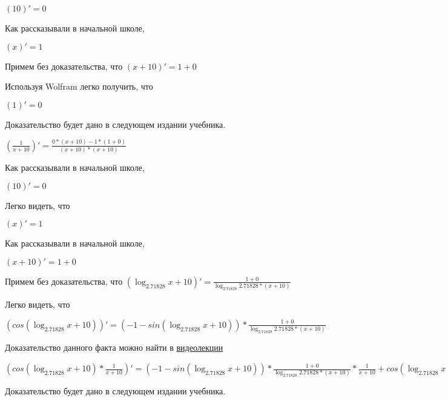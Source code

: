 \documentclass[12pt,a4paper,fleqn]{article}
\theoremstyle{definition}
\begin{document}
$( 10 )' =  0 $

Как рассказывали в начальной школе,

$( x )' =  1 $

Примем без доказательства, что
$( x  +  10 )' =  1  +  0 $

Используя Wolfram легко получить, что

$( 1 )' =  0 $

Доказательство будет дано в следующем издании учебника.

$(\frac{ 1 }{ x  +  10 }
)' = \frac{ 0  * ( x  +  10 ) -  1  * ( 1  +  0 )}{( x  +  10 ) * ( x  +  10 )}
$

Как рассказывали в начальной школе,

$( 10 )' =  0 $

Легко видеть, что

$( x )' =  1 $

Как рассказывали в начальной школе,

$( x  +  10 )' =  1  +  0 $

Примем без доказательства, что
$(\log_{ 2.71828 }{ x  +  10 })' = \frac{ 1  +  0 }{\log_{ 2.71828 }{ 2.71828 } * ( x  +  10 )}
$

Легко видеть, что

$(cos(\log_{ 2.71828 }{ x  +  10 }))' = ( -1  - sin(\log_{ 2.71828 }{ x  +  10 })) * \frac{ 1  +  0 }{\log_{ 2.71828 }{ 2.71828 } * ( x  +  10 )}
$

Доказательство данного факта можно найти в \href{https://www.youtube.com/watch?v=dQw4w9WgXcQ}{видеолекции}

$(cos(\log_{ 2.71828 }{ x  +  10 }) * \frac{ 1 }{ x  +  10 }
)' = ( -1  - sin(\log_{ 2.71828 }{ x  +  10 })) * \frac{ 1  +  0 }{\log_{ 2.71828 }{ 2.71828 } * ( x  +  10 )}
 * \frac{ 1 }{ x  +  10 }
 + cos(\log_{ 2.71828 }{ x  +  10 }) * \frac{ 0  * ( x  +  10 ) -  1  * ( 1  +  0 )}{( x  +  10 ) * ( x  +  10 )}
$

Доказательство будет дано в следующем издании учебника.
\end{document}

